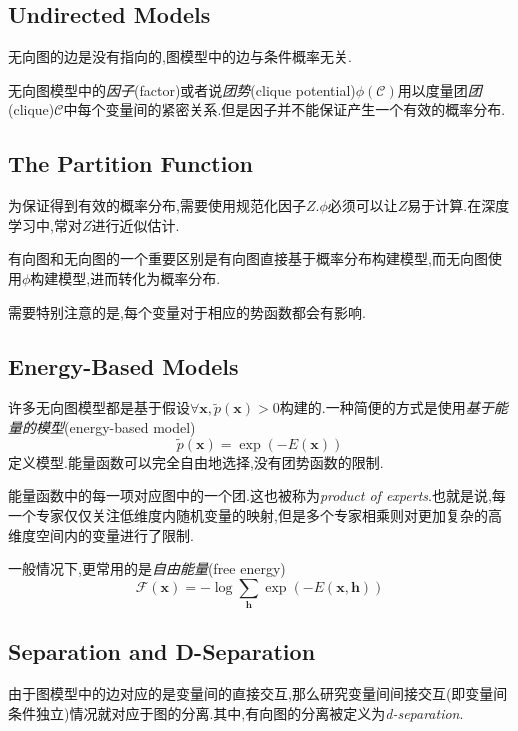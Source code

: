 \subsection{Undirected Models}

无向图的边是没有指向的,图模型中的边与条件概率无关.

无向图模型中的\textit{因子}(factor)或者说\textit{团势}(clique potential)$\phi(\mathcal C)$用以度量团\textit{团}(clique)$\mathcal C$中每个变量间的紧密关系.但是因子并不能保证产生一个有效的概率分布.

\subsection{The Partition Function}

为保证得到有效的概率分布,需要使用规范化因子$Z$.$\phi$必须可以让$Z$易于计算.在深度学习中,常对$Z$进行近似估计.

有向图和无向图的一个重要区别是有向图直接基于概率分布构建模型,而无向图使用$\phi$构建模型,进而转化为概率分布.

需要特别注意的是,每个变量对于相应的势函数都会有影响.

\subsection{Energy-Based Models}

许多无向图模型都是基于假设$\forall\bm x,\tilde p(\bm x)>0$构建的.一种简便的方式是使用\textit{基于能量的模型}(energy-based model)
\begin{equation}
\tilde p(\bm x)=\exp(-E(\bm x))
\end{equation}
定义模型.能量函数可以完全自由地选择,没有团势函数的限制.

能量函数中的每一项对应图中的一个团.这也被称为\textit{product of experts}.也就是说,每一个专家仅仅关注低维度内随机变量的映射,但是多个专家相乘则对更加复杂的高维度空间内的变量进行了限制.

一般情况下,更常用的是\textit{自由能量}(free energy)
\begin{equation}
\mathcal F(\bm x)=-\log\sum_{\bm h}\exp(-E(\bm{x,h}))
\end{equation}

\subsection{Separation and D-Separation}

由于图模型中的边对应的是变量间的直接交互,那么研究变量间间接交互(即变量间条件独立)情况就对应于图的分离.其中,有向图的分离被定义为\textit{d-separation}.

